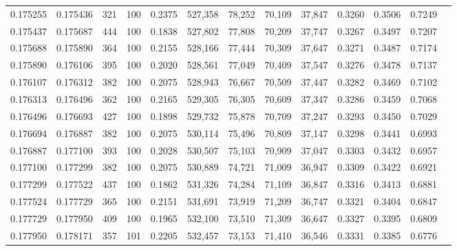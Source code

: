 \begin{tabular}{rrrrrrrrrrrrr}
0.175255 & 0.175436 &   321 & 100 &                                     0.2375 & 527,358 &  78,252 &  70,109 &  37,847 & 0.3260 & 0.3506 & 0.7249 \\
0.175437 & 0.175687 &   444 & 100 &                                     0.1838 & 527,802 &  77,808 &  70,209 &  37,747 & 0.3267 & 0.3497 & 0.7207 \\
0.175688 & 0.175890 &   364 & 100 &                                     0.2155 & 528,166 &  77,444 &  70,309 &  37,647 & 0.3271 & 0.3487 & 0.7174 \\
0.175890 & 0.176106 &   395 & 100 &                                     0.2020 & 528,561 &  77,049 &  70,409 &  37,547 & 0.3276 & 0.3478 & 0.7137 \\
0.176107 & 0.176312 &   382 & 100 &                                     0.2075 & 528,943 &  76,667 &  70,509 &  37,447 & 0.3282 & 0.3469 & 0.7102 \\
0.176313 & 0.176496 &   362 & 100 &                                     0.2165 & 529,305 &  76,305 &  70,609 &  37,347 & 0.3286 & 0.3459 & 0.7068 \\
0.176496 & 0.176693 &   427 & 100 &                                     0.1898 & 529,732 &  75,878 &  70,709 &  37,247 & 0.3293 & 0.3450 & 0.7029 \\
0.176694 & 0.176887 &   382 & 100 &                                     0.2075 & 530,114 &  75,496 &  70,809 &  37,147 & 0.3298 & 0.3441 & 0.6993 \\
0.176887 & 0.177100 &   393 & 100 &                                     0.2028 & 530,507 &  75,103 &  70,909 &  37,047 & 0.3303 & 0.3432 & 0.6957 \\
0.177100 & 0.177299 &   382 & 100 &                                     0.2075 & 530,889 &  74,721 &  71,009 &  36,947 & 0.3309 & 0.3422 & 0.6921 \\
0.177299 & 0.177522 &   437 & 100 &                                     0.1862 & 531,326 &  74,284 &  71,109 &  36,847 & 0.3316 & 0.3413 & 0.6881 \\
0.177524 & 0.177729 &   365 & 100 &                                     0.2151 & 531,691 &  73,919 &  71,209 &  36,747 & 0.3321 & 0.3404 & 0.6847 \\
0.177729 & 0.177950 &   409 & 100 &                                     0.1965 & 532,100 &  73,510 &  71,309 &  36,647 & 0.3327 & 0.3395 & 0.6809 \\
0.177950 & 0.178171 &   357 & 101 &                                     0.2205 & 532,457 &  73,153 &  71,410 &  36,546 & 0.3331 & 0.3385 & 0.6776 \\

\end{tabular}
